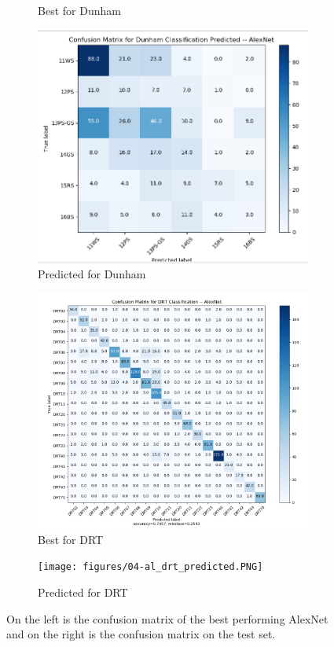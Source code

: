 \begin{figure}
\begin{subfigure}{.5\textwidth}
  \caption{Best for Dunham}
  \label{fig:rescm_dunham}
\end{subfigure}%
\begin{subfigure}{.5\textwidth}
  \centering
  \includegraphics[width=.8\linewidth]{figures/04-al_dunham_predicted.PNG}
  \caption{Predicted for Dunham}
  \label{fig:rescmpred_dunham}
\end{subfigure}
\begin{subfigure}{.5\textwidth}
  \centering
  \includegraphics[width=.8\linewidth]{figures/04-al_DRT_best.PNG}
  \caption{Best for DRT}
  \label{fig:rescm_drt}
\end{subfigure}%
\begin{subfigure}{.5\textwidth}
  \centering
  \texttt{[image: figures/04-al\_drt\_predicted.PNG]}
  \caption{Predicted for DRT}
  \label{fig:rescmpred_drt}
\end{subfigure}
\caption{On the left is the confusion matrix of the best performing AlexNet and on the right is the confusion matrix on the test set.}
\label{fig:rescms}
\end{figure}


